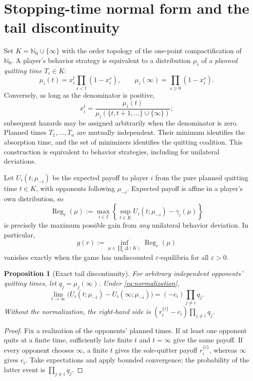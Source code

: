\documentclass[11pt,a4paper]{article}
\numberwithin{equation}{section}
\theoremstyle{plain}
\newtheorem{proposition}[theorem]{Proposition}
\theoremstyle{definition}
\theoremstyle{remark}
\newcommand{\NN}{\mathbb N_0}
\newcommand{\Reg}{\operatorname{Reg}}
\newcommand{\eps}{\varepsilon}
\begin{document}
\section{Stopping-time normal form and the tail discontinuity}\label{sec:stopping}
Set $K=\NN\cup\{\infty\}$ with the order topology of the one-point
compactification of $\NN$. A player's behavior strategy is equivalent to
a distribution $\mu_i$ of a \emph{planned quitting time} $T_i\in K$:
\begin{equation}\label{eq:hazards}
 \mu_i(t)=x_i^t\prod_{s<t}(1-x_i^s),\qquad
 \mu_i(\infty)=\prod_{s\ge0}(1-x_i^s).
\end{equation}
Conversely, as long as the denominator is positive,
\begin{equation}\label{eq:reverse-hazard}
 x_i^t=\frac{\mu_i(t)}{\mu_i(\{t,t+1,\ldots\}\cup\{\infty\})};
\end{equation}
subsequent hazards may be assigned arbitrarily when the denominator is
zero. Planned times $T_1,\ldots,T_n$ are mutually independent. Their
minimum identifies the absorption time, and the set of minimizers
identifies the quitting coalition. This construction is equivalent to
behavior strategies, including for unilateral deviations.

Let $U_i(t;\mu_{-i})$ be the expected payoff to player $i$ from the pure
planned quitting time $t\in K$, with opponents following $\mu_{-i}$.
Expected payoff is affine in a player's own distribution, so
\begin{equation}\label{eq:regret}
 \Reg_r(\mu):=\max_{i\in I}\left\{
 \sup_{t\in K}U_i(t;\mu_{-i})-\gamma_i(\mu)\right\}
\end{equation}
is precisely the maximum possible gain from \emph{any} unilateral
behavior deviation. In particular,
\begin{equation}\label{eq:g}
 g(r):=\inf_{\mu\in\prod_i\Delta(K)}\Reg_r(\mu)
\end{equation}
vanishes exactly when the game has undiscounted $\eps$-equilibria for
all $\eps>0$.

\begin{proposition}[Exact tail discontinuity]\label{prop:tail}
For arbitrary independent opponents' quitting times, let
$q_j=\mu_j(\infty)$. Under \eqref{eq:normalization},
\begin{equation}\label{eq:tail}
 \lim_{t\to\infty}\bigl(U_i(t;\mu_{-i})-U_i(\infty;\mu_{-i})\bigr)
 =(-c_i)\prod_{j\ne i}q_j.
\end{equation}
Without the normalization, the right-hand side is
$(r_i^{\{i\}}-c_i)\prod_{j\ne i}q_j$.
\end{proposition}
\begin{proof}
Fix a realization of the opponents' planned times. If at least one
opponent quits at a finite time, sufficiently late finite $t$ and
$t=\infty$ give the same payoff. If every opponent chooses $\infty$,
a finite $t$ gives the sole-quitter payoff $r_i^{\{i\}}$, whereas
$\infty$ gives $c_i$. Take expectations and apply bounded convergence;
the probability of the latter event is $\prod_{j\ne i}q_j$.
\end{proof}
\end{document}
